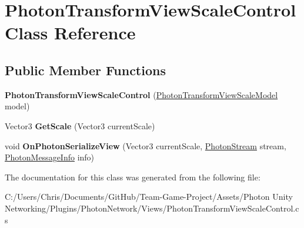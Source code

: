\hypertarget{class_photon_transform_view_scale_control}{}\section{Photon\+Transform\+View\+Scale\+Control Class Reference}
\label{class_photon_transform_view_scale_control}
\subsection*{Public Member Functions}
\begin{DoxyCompactItemize}
\item 
{\bfseries Photon\+Transform\+View\+Scale\+Control} (\hyperlink{class_photon_transform_view_scale_model}{Photon\+Transform\+View\+Scale\+Model} model)\hypertarget{class_photon_transform_view_scale_control_a4afeab195322ed62074a1bb41f091b91}{}\label{class_photon_transform_view_scale_control_a4afeab195322ed62074a1bb41f091b91}

\item 
Vector3 {\bfseries Get\+Scale} (Vector3 current\+Scale)\hypertarget{class_photon_transform_view_scale_control_a8345675a1c1c122f426c525c5b3dc5d3}{}\label{class_photon_transform_view_scale_control_a8345675a1c1c122f426c525c5b3dc5d3}

\item 
void {\bfseries On\+Photon\+Serialize\+View} (Vector3 current\+Scale, \hyperlink{class_photon_stream}{Photon\+Stream} stream, \hyperlink{class_photon_message_info}{Photon\+Message\+Info} info)\hypertarget{class_photon_transform_view_scale_control_a4bc567bf020c6807ad2e9960a25435e2}{}\label{class_photon_transform_view_scale_control_a4bc567bf020c6807ad2e9960a25435e2}

\end{DoxyCompactItemize}


The documentation for this class was generated from the following file\+:\begin{DoxyCompactItemize}
\item 
C\+:/\+Users/\+Chris/\+Documents/\+Git\+Hub/\+Team-\/\+Game-\/\+Project/\+Assets/\+Photon Unity Networking/\+Plugins/\+Photon\+Network/\+Views/Photon\+Transform\+View\+Scale\+Control.\+cs\end{DoxyCompactItemize}
